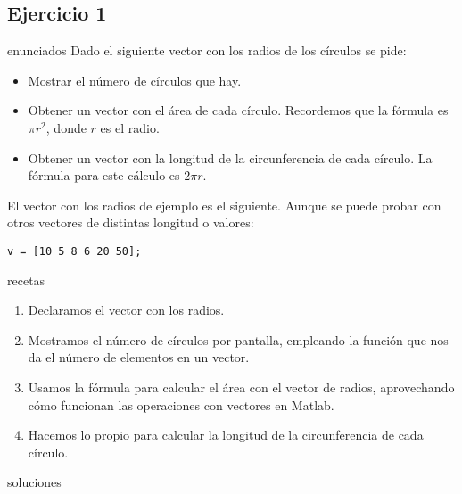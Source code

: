 \subsection{Ejercicio 1}
\def\parte{enunciados}
\ifx\capitulo\parte
Dado el siguiente vector con los radios de los círculos se pide:
\begin{itemize}
\item Mostrar el número de círculos que hay.
\item Obtener un vector con el área de cada círculo. Recordemos que la fórmula es $\pi r^2$, donde $r$ es el radio.
\item Obtener un vector con la longitud de la circunferencia de cada círculo. La fórmula para este cálculo es $2\pi r$.
\end{itemize}

El vector con los radios de ejemplo es el siguiente. Aunque se puede probar con otros vectores de distintas longitud o valores:

\begin{lstlisting}[style = matlab-style, numbers = none]
  v = [10 5 8 6 20 50];
\end{lstlisting}
\fi

\def\parte{recetas}
\ifx\capitulo\parte
\begin{enumerate}
\item Declaramos el vector con los radios.
\item Mostramos el número de círculos por pantalla, empleando la función que nos da el número de elementos en un vector.
\item Usamos la fórmula para calcular el área con el vector de radios, aprovechando cómo funcionan las operaciones con vectores en Matlab.
\item Hacemos lo propio para calcular la longitud de la circunferencia de cada círculo.
\end{enumerate}
\fi

\def\parte{soluciones}
\ifx\capitulo\parte

\fi
